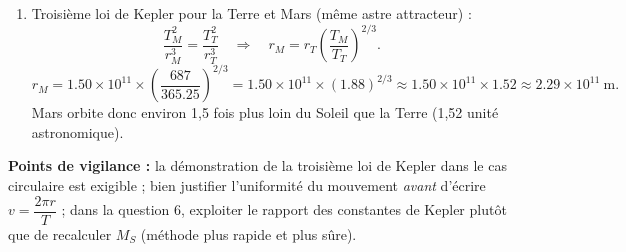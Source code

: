 \documentclass[11pt]{article}
\begin{document}
\begin{corrige}
\begin{enumerate}
\item Troisième loi de Kepler pour la Terre et Mars (même astre attracteur) :
\[ \dfrac{T_M^2}{r_M^3} = \dfrac{T_T^2}{r_T^3} \quad\Longrightarrow\quad r_M = r_T\left(\dfrac{T_M}{T_T}\right)^{2/3}. \]
\[ r_M = \num{1,50}\times 10^{11} \times \left(\dfrac{687}{\num{365,25}}\right)^{2/3} = \num{1,50}\times 10^{11} \times (\num{1,88})^{2/3} \approx \num{1,50}\times 10^{11} \times \num{1,52} \approx \num{2,29}\times 10^{11}\ \mathrm{m}. \]
Mars orbite donc environ 1,5 fois plus loin du Soleil que la Terre (1,52 unité astronomique).
\end{enumerate}
\textbf{Points de vigilance :} la démonstration de la troisième loi de Kepler dans le cas circulaire est exigible ; bien justifier l'uniformité du mouvement \emph{avant} d'écrire $v = \dfrac{2\pi r}{T}$ ; dans la question 6, exploiter le rapport des constantes de Kepler plutôt que de recalculer $M_S$ (méthode plus rapide et plus sûre).
\end{corrige}
\end{document}

